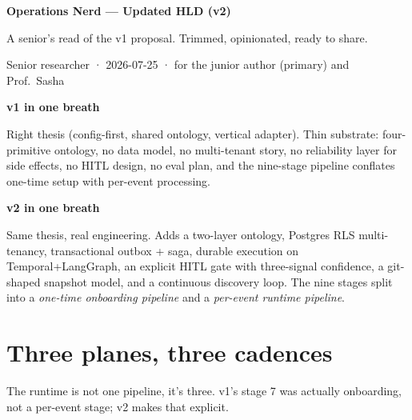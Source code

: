 \documentclass[11pt,a4paper]{article}
\title{}
\author{}
\date{}
\newcommand{\unnumsec}[1]{%
  \par\addvspace{10pt}%
  {\large\bfseries\color{accent} #1\par}%
  \addvspace{2pt}%
  \nopagebreak
}
\begin{document}
\begin{tcolorbox}[
  enhanced, colback=accent, colframe=accent, arc=2pt, boxrule=0pt,
  left=16pt, right=16pt, top=10pt, bottom=10pt,
  borderline west={3pt}{0pt}{white},
  fontupper=\color{white}
]
  {\LARGE\bfseries Operations Nerd — Updated HLD (v2)}\par
  \vspace{1pt}
  {\small A senior's read of the v1 proposal. Trimmed, opinionated, ready to share.}
\end{tcolorbox}

\vspace{2pt}
\begin{center}
  \small\color{inkmuted}
  Senior researcher · 2026-07-25 · for the junior author (primary) and Prof.\ Sasha
\end{center}

\vspace{2pt}
\unnumsec{v1 in one breath}
Right thesis (config-first, shared ontology, vertical adapter). Thin
substrate: four-primitive ontology, no data model, no multi-tenant story,
no reliability layer for side effects, no HITL design, no eval plan, and
the nine-stage pipeline conflates one-time setup with per-event processing.

\unnumsec{v2 in one breath}
Same thesis, real engineering. Adds a two-layer ontology, Postgres RLS
multi-tenancy, transactional outbox + saga, durable execution on
Temporal+LangGraph, an explicit HITL gate with three-signal confidence, a
git-shaped snapshot model, and a continuous discovery loop. The nine
stages split into a \emph{one-time onboarding pipeline} and a
\emph{per-event runtime pipeline}.

\section{Three planes, three cadences}

The runtime is not one pipeline, it's three. v1's stage 7 was actually
onboarding, not a per-event stage; v2 makes that explicit.
\end{document}
